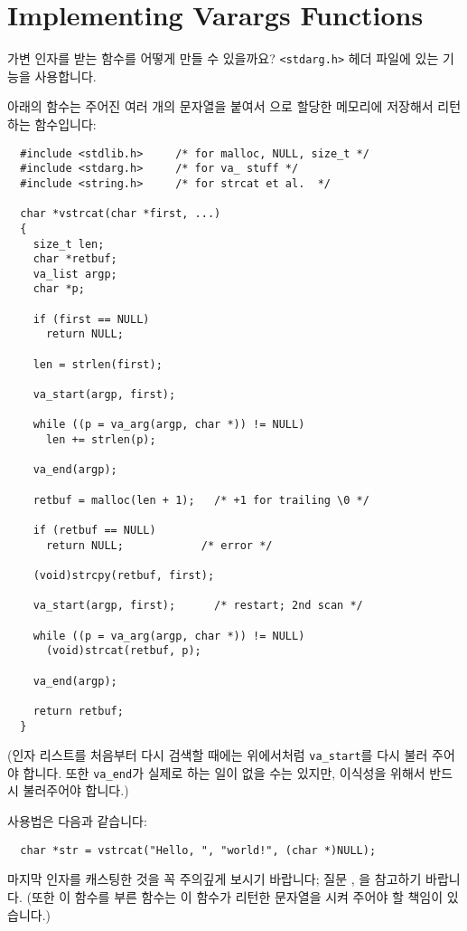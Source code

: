 \section{Implementing Varargs Functions}

\begin{faq}
	가변 인자를 받는 함수를 어떻게 만들 수 있을까요?
\A
	\verb+<stdarg.h>+ 헤더 파일에 있는 기능을 사용합니다.

	아래의 함수는 주어진 여러 개의 문자열을 붙여서 으로 할당한
	메모리에 저장해서 리턴하는 함수입니다:

\begin{verbatim}
  #include <stdlib.h>     /* for malloc, NULL, size_t */
  #include <stdarg.h>     /* for va_ stuff */
  #include <string.h>     /* for strcat et al.  */

  char *vstrcat(char *first, ...)
  {
    size_t len;
    char *retbuf;
    va_list argp;
    char *p;

    if (first == NULL)
      return NULL;

    len = strlen(first);

    va_start(argp, first);

    while ((p = va_arg(argp, char *)) != NULL)
      len += strlen(p);

    va_end(argp);

    retbuf = malloc(len + 1);   /* +1 for trailing \0 */

    if (retbuf == NULL)
      return NULL;            /* error */

    (void)strcpy(retbuf, first);

    va_start(argp, first);      /* restart; 2nd scan */

    while ((p = va_arg(argp, char *)) != NULL)
      (void)strcat(retbuf, p);

    va_end(argp);

    return retbuf;
  }
\end{verbatim}
	\noindent (인자 리스트를 처음부터 다시 검색할 때에는 위에서처럼 
        \verb+va_start+를 다시 불러 주어야 합니다. 또한 \verb+va_end+가
        실제로 하는 일이 없을 수는 있지만, 이식성을 위해서 반드시 불러주어야 합니다.)


\noindent 사용법은 다음과 같습니다:
\begin{verbatim}
  char *str = vstrcat("Hello, ", "world!", (char *)NULL);
\end{verbatim}
	\noindent 마지막 인자를 캐스팅한 것을 꼭 주의깊게 보시기 바랍니다;
	질문 , 을 참고하기 바랍니다.  (또한 이 함수를 부른 함수는
	이 함수가 리턴한 문자열을 시켜 주어야 할 책임이 있습니다.)


\end{faq}
